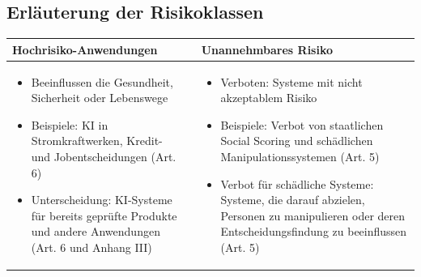 \documentclass[aspectratio=169,16pt,xcolor=table]{beamer}
\begin{document}

\subsection{Erläuterung der Risikoklassen}
    \begin{frame} %
    \begin{center}

\begin{tabular}{|p{6.5cm}|@{}p{1cm}@{}|p{6.5cm}|}
    \hline
    \small
    \cellcolor{red!25}\textbf{Hochrisiko-Anwendungen} & \textbf{} & \cellcolor{red!50}\textbf{Unannehmbares Risiko} \\
    \hline
            \small
            \begin{itemize}
                \item Beeinflussen die Gesundheit, Sicherheit oder Lebenswege 
                \item Beispiele: KI in Stromkraftwerken, Kredit- und Jobentscheidungen (Art. 6)
                \item Unterscheidung: KI-Systeme für bereits geprüfte Produkte und andere Anwendungen (Art. 6 und Anhang III)
            \end{itemize}
            & & 

            \small
            \begin{itemize}
                \item Verboten: Systeme mit nicht akzeptablem Risiko 
                \item Beispiele: Verbot von staatlichen Social Scoring und schädlichen Manipulationssystemen (Art. 5) 
                \item Verbot für schädliche Systeme: Systeme, die darauf abzielen, Personen zu manipulieren oder deren Entscheidungsfindung zu beeinflussen (Art. 5)
            \end{itemize} \\
        \hline
    \end{tabular}

    \end{center}
\end{frame}

\end{document}
